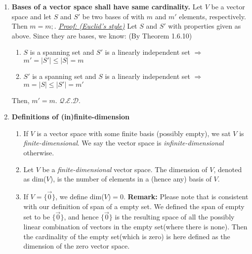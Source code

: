 \documentclass[oneside, 12pt]{book}
\newcommand{\settag}[1]{\renewcommand{\theenumi}{#1}}
\newcommand{\qed}{\hfill $\mathcal{Q}.\mathcal{E}.\mathcal{D}.$}
\newcommand{\tbf}[1]{\textbf{#1}}
\newcommand{\tit}[1]{\textit{#1}}
\begin{document}
\begin{enumerate}
        
        \settag{1.6.11}
        \item \tbf{Bases of a vector space shall have same cardinality.} Let $V$ be a vector space and let $S$ and $S'$ be two bases of  with $m$ and $m'$ elements, respectively. Then $m=m;$. \newline
        \tit{\underline{Proof: (Euclid's style)}} \newline
        Let $S$ and $S'$ with properties given as above. Since they are bases, we know: (By Theorem 1.6.10)
        \begin{enumerate}
            \item $S$ is a spanning set and $S'$ is a linearly independent set \newline $\Longrightarrow$ $m'=|S'| \leq |S|=m$
            \item $S'$ is a spanning set and $S$ is a linearly independent set \newline $\Longrightarrow$ $m=|S| \leq |S'|=m'$
        \end{enumerate}
        Then, $m'=m$. \qed
        
        \settag{1.6.12}
        \item \tbf{Definitions of (in)finite-dimension}
        \begin{enumerate}
            \item If $V$ is a vector space with some finite basis (possibly empty), we sat $V$ is \tit{finite-dimensional}. We say the vector space is \tit{infinite-dimensional} otherwise.
            \item Let $V$ be a \tit{finite-dimensional} vector space. The dimension of $V$, denoted as dim($V$), is the number of elements in a (hence any) basis of $V$.
            \item If $V=\{\vec{0}\}$, we define dim($V$)$=0$. \tbf{Remark: }Please note that is consistent with our definition of span of a empty set. We defined the span of empty set to be $\{\vec{0}\}$, and hence $\{\vec{0}\}$ is the resulting space of all the possibly linear combination of vectors in the empty set(where there is none). Then the cardinality of the empty set(which is zero) is here defined as the dimension of the zero vector space.
        \end{enumerate}
        

\end{enumerate}
\end{document}
